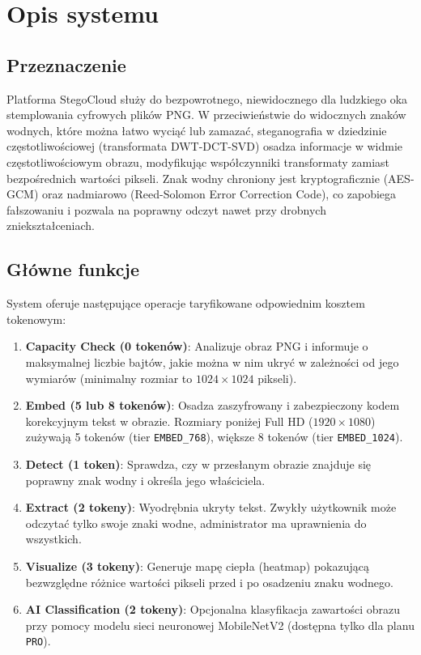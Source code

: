 \documentclass[12pt,a4paper]{article}
\begin{document}
\section{Opis systemu}

\subsection{Przeznaczenie}
Platforma StegoCloud służy do bezpowrotnego, niewidocznego dla ludzkiego oka stemplowania cyfrowych plików PNG. W przeciwieństwie do widocznych znaków wodnych, które można łatwo wyciąć lub zamazać, steganografia w dziedzinie częstotliwościowej (transformata DWT-DCT-SVD) osadza informacje w widmie częstotliwościowym obrazu, modyfikując współczynniki transformaty zamiast bezpośrednich wartości pikseli. Znak wodny chroniony jest kryptograficznie (AES-GCM) oraz nadmiarowo (Reed-Solomon Error Correction Code), co zapobiega fałszowaniu i pozwala na poprawny odczyt nawet przy drobnych zniekształceniach.

\subsection{Główne funkcje}
System oferuje następujące operacje taryfikowane odpowiednim kosztem tokenowym:
\begin{enumerate}
    \item \textbf{Capacity Check (0 tokenów)}: Analizuje obraz PNG i informuje o maksymalnej liczbie bajtów, jakie można w nim ukryć w zależności od jego wymiarów (minimalny rozmiar to $1024 \times 1024$ pikseli).
    \item \textbf{Embed (5 lub 8 tokenów)}: Osadza zaszyfrowany i zabezpieczony kodem korekcyjnym tekst w obrazie. Rozmiary poniżej Full HD ($1920 \times 1080$) zużywają 5 tokenów (tier \texttt{EMBED\_768}), większe 8 tokenów (tier \texttt{EMBED\_1024}).
    \item \textbf{Detect (1 token)}: Sprawdza, czy w przesłanym obrazie znajduje się poprawny znak wodny i określa jego właściciela.
    \item \textbf{Extract (2 tokeny)}: Wyodrębnia ukryty tekst. Zwykły użytkownik może odczytać tylko swoje znaki wodne, administrator ma uprawnienia do wszystkich.
    \item \textbf{Visualize (3 tokeny)}: Generuje mapę ciepła (heatmap) pokazującą bezwzględne różnice wartości pikseli przed i po osadzeniu znaku wodnego.
    \item \textbf{AI Classification (2 tokeny)}: Opcjonalna klasyfikacja zawartości obrazu przy pomocy modelu sieci neuronowej MobileNetV2 (dostępna tylko dla planu \texttt{PRO}).
\end{enumerate}
\end{document}
